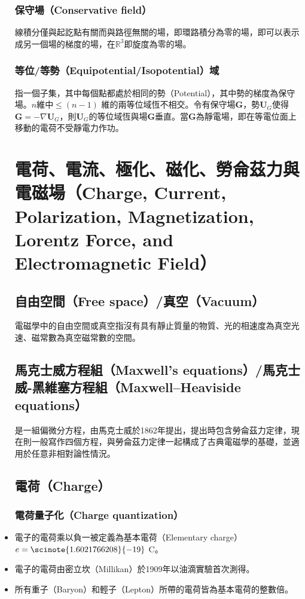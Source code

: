 \documentclass[a4paper,12pt]{report}
\begin{document}
\begin{itemize}
\subsubsection{保守場（Conservative field）}
線積分僅與起訖點有關而與路徑無關的場，即環路積分為零的場，即可以表示成另一個場的梯度的場，在$\mathbb{R}^3$即旋度為零的場。
\subsubsection{等位/等勢（Equipotential/Isopotential）域}
指一個子集，其中每個點都處於相同的勢（Potential），其中勢的梯度為保守場。$n$維中$\leq (n-1)$ 維的兩等位域恆不相交。令有保守場$\mathbf{G}$，勢$\mathbf{U}_G$使得$\mathbf{G}=-\nabla\mathbf{U}_G$，則$\mathbf{U}_G$的等位域恆與場$\mathbf{G}$垂直。當$\mathbf{G}$為靜電場，即在等電位面上移動的電荷不受靜電力作功。


\section{電荷、電流、極化、磁化、勞侖茲力與電磁場（Charge, Current, Polarization, Magnetization, Lorentz Force, and Electromagnetic Field）}
\subsection{自由空間（Free space）/真空（Vacuum）}
電磁學中的自由空間或真空指沒有具有靜止質量的物質、光的相速度為真空光速、磁常數為真空磁常數的空間。
\subsection{馬克士威方程組（Maxwell's equations）/馬克士威-黑維塞方程組（Maxwell–Heaviside equations）}
是一組偏微分方程，由馬克士威於1862年提出，提出時包含勞侖茲力定律，現在則一般寫作四個方程，與勞侖茲力定律一起構成了古典電磁學的基礎，並適用於任意非相對論性情況。
\subsection{電荷（Charge）}
\subsubsection{電荷量子化（Charge quantization）}
\bit
\item 電子的電荷乘以負一被定義為基本電荷（Elementary charge）$e=\scinote{1.6021766208}{-19}$ C。
\item 電子的電荷由密立坎（Millikan）於1909年以油滴實驗首次測得。
\item 所有重子（Baryon）和輕子（Lepton）所帶的電荷皆為基本電荷的整數倍。
\eit

\end{itemize}
\end{document}
